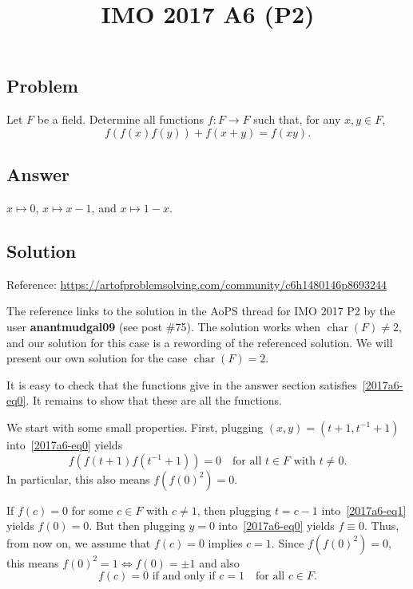\documentclass{article}
\title{IMO 2017 A6 (P2)}
\author{}
\date{}
\DeclareMathOperator{\rchar}{char}
\begin{document}
\maketitle



\subsection*{Problem}

Let $F$ be a field.
Determine all functions $f : F \to F$ such that, for any $x, y \in F$,
\[ f(f(x) f(y)) + f(x + y) = f(xy). \tag{*}\label{2017a6-eq0} \]



\subsection*{Answer}

$x \mapsto 0$, $x \mapsto x - 1$, and $x \mapsto 1 - x$.



\subsection*{Solution}

Reference: \url{https://artofproblemsolving.com/community/c6h1480146p8693244}

The reference links to the solution in the AoPS thread for IMO 2017 P2 by the user \textbf{anantmudgal09} (see post \#75).
The solution works when $\rchar(F) \neq 2$, and our solution for this case is a rewording of the referenced solution.
We will present our own solution for the case $\rchar(F) = 2$.

It is easy to check that the functions give in the answer section satisfies~\eqref{2017a6-eq0}.
It remains to show that these are all the functions.

We start with some small properties.
First, plugging $(x, y) = (t + 1, t^{-1} + 1)$ into~\eqref{2017a6-eq0} yields
\[ f(f(t + 1) f(t^{-1} + 1)) = 0 \quad \text{for all } t \in F \text{ with } t \neq 0. \tag{1}\label{2017a6-eq1} \]
In particular, this also means $f(f(0)^2) = 0$.

If $f(c) = 0$ for some $c \in F$ with $c \neq 1$, then plugging $t = c - 1$ into~\eqref{2017a6-eq1} yields $f(0) = 0$.
But then plugging $y = 0$ into~\eqref{2017a6-eq0} yields $f \equiv 0$.
Thus, from now on, we assume that $f(c) = 0$ implies $c = 1$.
Since $f(f(0)^2) = 0$, this means $f(0)^2 = 1 \iff f(0) = \pm 1$ and also
\[ f(c) = 0 \text{ if and only if } c = 1 \quad \text{for all } c \in F. \tag{2}\label{2017a6-eq2} \]
\end{document}
